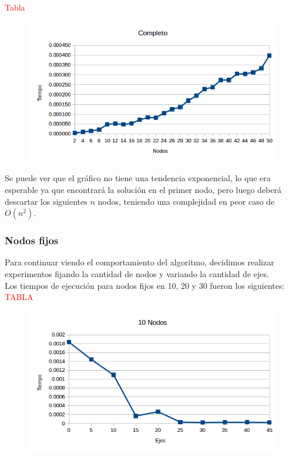 \textcolor{red}{Tabla}

  \begin{figure}[h!]
   \begin{center}
 	\includegraphics[scale=0.7]{imagenes/exacto/Completos.png}
   \end{center}
 \end{figure}

Se puede ver que el gr\'afico no tiene una tendencia exponencial, lo que era esperable ya que encontrar\'a la soluci\'on en el primer nodo, pero luego deber\'a descartar los siguientes $n$ nodos,
teniendo una complejidad en peor caso de $O(n^2)$.\\

\newpage

\subsubsection{Nodos fijos}
Para continuar viendo el comportamiento del algoritmo, decidimos realizar experimentos fijando la cantidad de nodos y variando la cantidad de ejes.\\

Los tiempos de ejecuci\'on para nodos fijos en 10, 20 y 30 fueron los siguientes:\\
\textcolor{red}{TABLA}

  \begin{figure}[h!]
   \begin{center}
 	\includegraphics[scale=0.7]{imagenes/exacto/10Nodos.png}
   \end{center}
 \end{figure}

